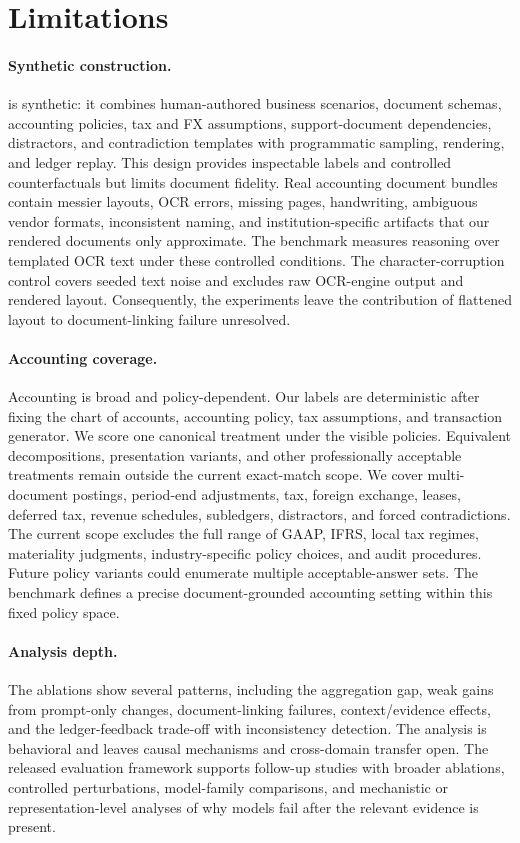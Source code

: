 \section*{Limitations}

\paragraph{Synthetic construction.}
\benchmark{} is synthetic: it combines human-authored business scenarios, document schemas, accounting policies, tax and FX assumptions, support-document dependencies, distractors, and contradiction templates with programmatic sampling, rendering, and ledger replay. This design provides inspectable labels and controlled counterfactuals but limits document fidelity. Real accounting document bundles contain messier layouts, OCR errors, missing pages, handwriting, ambiguous vendor formats, inconsistent naming, and institution-specific artifacts that our rendered documents only approximate. The benchmark measures reasoning over templated OCR text under these controlled conditions. The character-corruption control covers seeded text noise and excludes raw OCR-engine output and rendered layout. Consequently, the experiments leave the contribution of flattened layout to document-linking failure unresolved.

\paragraph{Accounting coverage.}
Accounting is broad and policy-dependent. Our labels are deterministic after fixing the chart of accounts, accounting policy, tax assumptions, and transaction generator. We score one canonical treatment under the visible policies. Equivalent decompositions, presentation variants, and other professionally acceptable treatments remain outside the current exact-match scope. We cover multi-document postings, period-end adjustments, tax, foreign exchange, leases, deferred tax, revenue schedules, subledgers, distractors, and forced contradictions. The current scope excludes the full range of GAAP, IFRS, local tax regimes, materiality judgments, industry-specific policy choices, and audit procedures. Future policy variants could enumerate multiple acceptable-answer sets. The benchmark defines a precise document-grounded accounting setting within this fixed policy space.

\paragraph{Analysis depth.}
The ablations show several patterns, including the aggregation gap, weak gains from prompt-only changes, document-linking failures, context/evidence effects, and the ledger-feedback trade-off with inconsistency detection. The analysis is behavioral and leaves causal mechanisms and cross-domain transfer open. The released evaluation framework supports follow-up studies with broader ablations, controlled perturbations, model-family comparisons, and mechanistic or representation-level analyses of why models fail after the relevant evidence is present.

